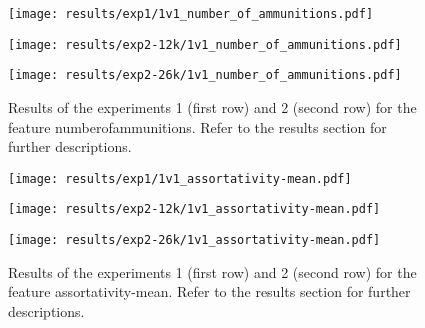 \begin{figure}[h!]
	\centering
	\begin{minipage}{0.4\linewidth}
		\texttt{[image: results/exp1/1v1\_number\_of\_ammunitions.pdf]}
	\end{minipage}
	
	\begin{minipage}{0.4\linewidth}
		\texttt{[image: results/exp2-12k/1v1\_number\_of\_ammunitions.pdf]}
	\end{minipage}
	\begin{minipage}{0.4\linewidth}
		\texttt{[image: results/exp2-26k/1v1\_number\_of\_ammunitions.pdf]}
	\end{minipage}
	
	\caption[ Results: Feature number\textunderscore of\textunderscore ammunitions]{ Results of the experiments 1 (first row) and 2 (second row) for the feature number\textunderscore of\textunderscore ammunitions. Refer to the results section for further descriptions. }
	\label{fig:appendix_number_of_ammunitions}
\end{figure}

\begin{figure}[h!]
	\centering
	\begin{minipage}{0.4\linewidth}
		\texttt{[image: results/exp1/1v1\_assortativity-mean.pdf]}
	\end{minipage}
	
	\begin{minipage}{0.4\linewidth}
		\texttt{[image: results/exp2-12k/1v1\_assortativity-mean.pdf]}
	\end{minipage}
	\begin{minipage}{0.4\linewidth}
		\texttt{[image: results/exp2-26k/1v1\_assortativity-mean.pdf]}
	\end{minipage}
	
	\caption[ Results: Feature assortativity-mean]{ Results of the experiments 1 (first row) and 2 (second row) for the feature assortativity-mean. Refer to the results section for further descriptions. }
	\label{fig:appendix_assortativity-mean}
\end{figure}
\newpage 


